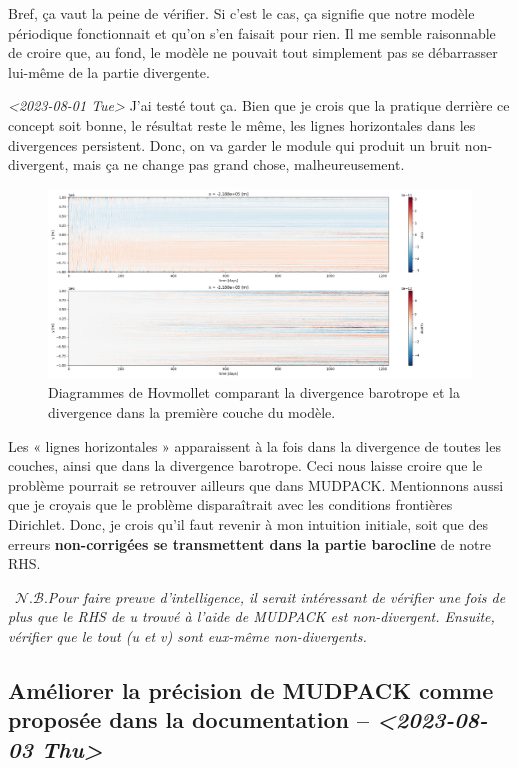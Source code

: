 \documentclass[10pt]{article}
\numberwithin{equation}{section}
\newcommand{\nb}{\raisebox{0.8pt}{\scriptsize\textleaf}\ $\mathscr{N. B.}$\hspace{4pt}}
\begin{document}
Bref, ça vaut la peine de vérifier.
Si c'est le cas, ça signifie que notre modèle périodique fonctionnait et qu'on s'en faisait pour rien.
Il me semble raisonnable de croire que, au fond, le modèle ne pouvait tout simplement pas se débarrasser lui-même de la partie divergente.\bigskip

\textit{<2023-08-01 Tue> } J'ai testé tout ça.
Bien que je crois que la pratique derrière ce concept soit bonne, le résultat reste le même, les lignes horizontales dans les divergences persistent.
Donc, on va garder le module qui produit un bruit non-divergent, mais ça ne change pas grand chose, malheureusement.

\begin{figure}[htbp]
\centering
\includegraphics[width=.9\linewidth]{figures/debuggage/2023_08_03_comp_divergences.png}
\caption{Diagrammes de Hovmollet comparant la divergence barotrope et la divergence dans la première couche du modèle.}
\end{figure}

Les « lignes horizontales » apparaissent à la fois dans la divergence de toutes les couches, ainsi que dans la divergence barotrope.
Ceci nous laisse croire que le problème pourrait se retrouver ailleurs que dans MUDPACK.
Mentionnons aussi que je croyais que le problème disparaîtrait avec les conditions frontières Dirichlet.
Donc, je crois qu'il faut revenir à mon intuition initiale, soit que des erreurs \textbf{non-corrigées se transmettent dans la partie barocline} de notre RHS.\bigskip

\nb \emph{Pour faire preuve d'intelligence, il serait intéressant de vérifier une fois de plus que le RHS de u trouvé à l'aide de MUDPACK est non-divergent.
Ensuite, vérifier que le tout (u et v) sont eux-même non-divergents.}


\subsection{Améliorer la précision de MUDPACK comme proposée dans la documentation -- \textit{<2023-08-03 Thu>}}
\label{sec:org78bc860}
\end{document}
